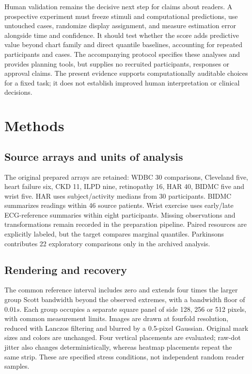 \documentclass[11pt]{article}
\begin{document}
Human validation remains the decisive next step for claims about readers. A prospective experiment must freeze stimuli and computational predictions, use untouched cases, randomize display assignment, and measure estimation error alongside time and confidence. It should test whether the score adds predictive value beyond chart family and direct quantile baselines, accounting for repeated participants and cases. The accompanying protocol specifies these analyses and provides planning tools, but supplies no recruited participants, responses or approval claims. The present evidence supports computationally auditable choices for a fixed task; it does not establish improved human interpretation or clinical decisions.

\section*{Methods}
\subsection*{Source arrays and units of analysis}
The original prepared arrays are retained: WDBC 30 comparisons, Cleveland five, heart failure six, CKD 11, ILPD nine, retinopathy 16, HAR 40, BIDMC five and wrist five. HAR uses subject/activity medians from 30 participants. BIDMC summarizes readings within 46 source patients. Wrist exercise uses early/late ECG-reference summaries within eight participants.\cite{pimentel2017,jarchi2017} Missing observations and transformations remain recorded in the preparation pipeline. Paired resources are explicitly labeled, but the target compares marginal quantiles. Parkinsons contributes 22 exploratory comparisons only in the archived analysis.

\subsection*{Rendering and recovery}
The common reference interval includes zero and extends four times the larger group Scott bandwidth beyond the observed extremes, with a bandwidth floor of $0.01s$. Each group occupies a separate square panel of side 128, 256 or 512 pixels, with common measurement limits. Images are drawn at fourfold resolution, reduced with Lanczos filtering and blurred by a 0.5-pixel Gaussian. Original mark sizes and colors are unchanged. Four vertical placements are evaluated; raw-dot jitter also changes deterministically, whereas heatmap placements repeat the same strip. These are specified stress conditions, not independent random reader samples.
\end{document}
